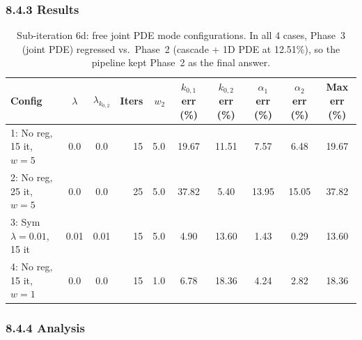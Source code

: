 \documentclass[11pt]{article}
\begin{document}
\subsubsection*{8.4.3 Results}

\begin{table}[H]
  \centering
  \caption{Sub-iteration 6d: free joint PDE mode configurations.  In all
           4 cases, Phase~3 (joint PDE) regressed vs.\ Phase~2 (cascade +
           1D PDE at 12.51\%), so the pipeline kept Phase~2 as the final
           answer.}
  \label{tab:s6d}
  \begin{tabular}{l c c r r
                    S[round-precision=2] S[round-precision=2]
                    S[round-precision=2] S[round-precision=2]
                    S[round-precision=2]}
    \toprule
    Config & {$\lambda$} & {$\lambda_{k_{0,2}}$}
           & {Iters} & {$w_2$}
           & {$k_{0,1}$ err (\%)} & {$k_{0,2}$ err (\%)}
           & {$\alpha_1$ err (\%)} & {$\alpha_2$ err (\%)}
           & {Max err (\%)} \\
    : No reg, 15 it, $w{=}5$         & 0.0  & 0.0  & 15 & 5.0 & 19.67 & 11.51 &  7.57 &  6.48 & 19.67 \\
    2: No reg, 25 it, $w{=}5$         & 0.0  & 0.0  & 25 & 5.0 & 37.82 &  5.40 & 13.95 & 15.05 & 37.82 \\
    3: Sym $\lambda{=}0.01$, 15 it    & 0.01 & 0.01 & 15 & 5.0 &  4.90 & 13.60 &  1.43 &  0.29 & 13.60 \\
    4: No reg, 15 it, $w{=}1$         & 0.0  & 0.0  & 15 & 1.0 &  6.78 & 18.36 &  4.24 &  2.82 & 18.36 \\
    \bottomrule
  \end{tabular}
\end{table}

\subsubsection*{8.4.4 Analysis}
\end{document}
